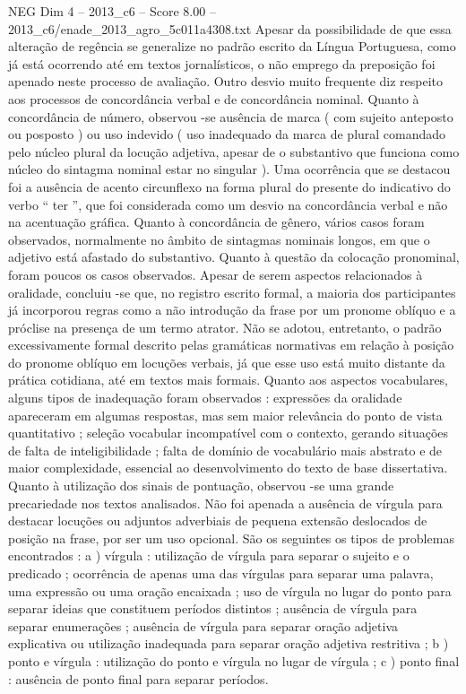 \begin{textsample}{NEG Dim 4 – 2013\_c6 – Score 8.00 – 2013\_c6/enade\_2013\_agro\_5c011a4308.txt}
Apesar da possibilidade de que essa alteração de regência se generalize no padrão escrito da Língua Portuguesa, como já está ocorrendo até em textos jornalísticos, o não emprego da preposição foi apenado neste processo de avaliação.
Outro desvio muito frequente diz respeito aos processos de concordância verbal e de concordância nominal.
Quanto à concordância de número, observou -se ausência de marca ( com sujeito anteposto ou posposto ) ou uso indevido ( uso inadequado da marca de plural comandado pelo núcleo plural da locução adjetiva, apesar de o substantivo que funciona como núcleo do sintagma nominal estar no singular ).
Uma ocorrência que se destacou foi a ausência de acento circunflexo na forma plural do presente do indicativo do verbo “ ter ”, que foi considerada como um desvio na concordância verbal e não na acentuação gráfica.
Quanto à concordância de gênero, vários casos foram observados, normalmente no âmbito de sintagmas nominais longos, em que o adjetivo está afastado do substantivo.
Quanto à questão da colocação pronominal, foram poucos os casos observados.
Apesar de serem aspectos relacionados à oralidade, concluiu -se que, no registro escrito formal, a maioria dos participantes já incorporou regras como a não introdução da frase por um pronome oblíquo e a próclise na presença de um termo atrator.
Não se adotou, entretanto, o padrão excessivamente formal descrito pelas gramáticas normativas em relação à posição do pronome oblíquo em locuções verbais, já que esse uso está muito distante da prática cotidiana, até em textos mais formais.
Quanto aos aspectos vocabulares, alguns tipos de inadequação foram observados : expressões da oralidade apareceram em algumas respostas, mas sem maior relevância do ponto de vista quantitativo ; seleção vocabular incompatível com o contexto, gerando situações de falta de inteligibilidade ; falta de domínio de vocabulário mais abstrato e de maior complexidade, essencial ao desenvolvimento do texto de base dissertativa.
Quanto à utilização dos sinais de pontuação, observou -se uma grande precariedade nos textos analisados.
Não foi apenada a ausência de vírgula para destacar locuções ou adjuntos adverbiais de pequena extensão deslocados de posição na frase, por ser um uso opcional.
São os seguintes os tipos de problemas encontrados : a ) vírgula : utilização de vírgula para separar o sujeito e o predicado ; ocorrência de apenas uma das vírgulas para separar uma palavra, uma expressão ou uma oração encaixada ; uso de vírgula no lugar do ponto para separar ideias que constituem períodos distintos ; ausência de vírgula para separar enumerações ; ausência de vírgula para separar oração adjetiva explicativa ou utilização inadequada para separar oração adjetiva restritiva ; b ) ponto e vírgula : utilização do ponto e vírgula no lugar de vírgula ; c ) ponto final : ausência de ponto final para separar períodos.

\end{textsample}
